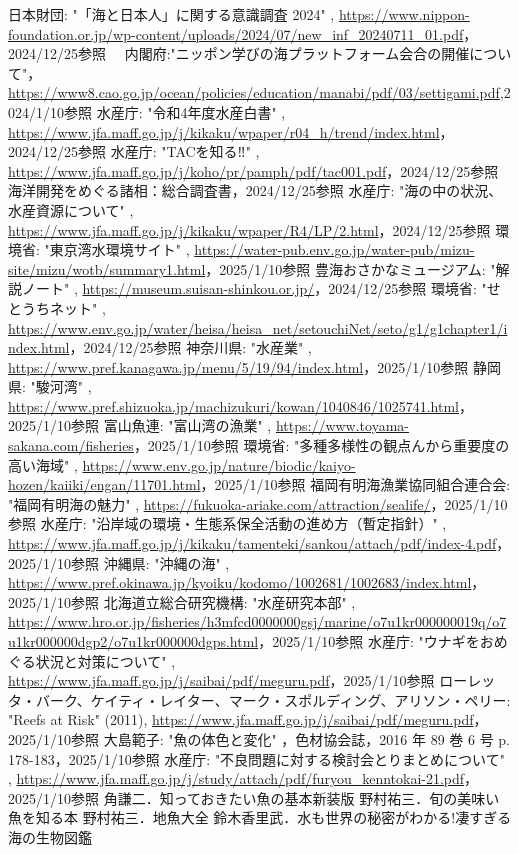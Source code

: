 \documentclass[12pt,a4j,titlepage]{ltjsarticle}
\begin{document}
\begin{thebibliography}{99}
  日本財団: "「海と日本人」に関する意識調査 2024" , \url{https://www.nippon-foundation.or.jp/wp-content/uploads/2024/07/new_inf_20240711_01.pdf}，2024/12/25参照
　内閣府:"ニッポン学びの海プラットフォーム会合の開催について"，\url{https://www8.cao.go.jp/ocean/policies/education/manabi/pdf/03/settigami.pdf},2024/1/10参照
  水産庁: "令和4年度水産白書" , \url{https://www.jfa.maff.go.jp/j/kikaku/wpaper/r04_h/trend/index.html}，2024/12/25参照
  水産庁: "TACを知る‼︎" , \url{https://www.jfa.maff.go.jp/j/koho/pr/pamph/pdf/tac001.pdf}，2024/12/25参照
  海洋開発をめぐる諸相：総合調査書，2024/12/25参照
  水産庁: "海の中の状況、水産資源について" , \url{https://www.jfa.maff.go.jp/j/kikaku/wpaper/R4/LP/2.html}，2024/12/25参照
  環境省: "東京湾水環境サイト" , \url{https://water-pub.env.go.jp/water-pub/mizu-site/mizu/wotb/summary1.html}，2025/1/10参照
  豊海おさかなミュージアム: "解説ノート" , \url{https://museum.suisan-shinkou.or.jp/}，2024/12/25参照
  環境省: "せとうちネット" , \url{https://www.env.go.jp/water/heisa/heisa_net/setouchiNet/seto/g1/g1chapter1/index.html}，2024/12/25参照
  神奈川県: "水産業" , \url{https://www.pref.kanagawa.jp/menu/5/19/94/index.html}，2025/1/10参照
  静岡県: "駿河湾" , \url{https://www.pref.shizuoka.jp/machizukuri/kowan/1040846/1025741.html}，2025/1/10参照
  富山魚連: "富山湾の漁業" , \url{https://www.toyama-sakana.com/fisheries}，2025/1/10参照
  環境省: "多種多様性の観点んから重要度の高い海域" , \url{https://www.env.go.jp/nature/biodic/kaiyo-hozen/kaiiki/engan/11701.html}，2025/1/10参照
  福岡有明海漁業協同組合連合会: "福岡有明海の魅力" , \url{https://fukuoka-ariake.com/attraction/sealife/}，2025/1/10参照
  水産庁: "沿岸域の環境・生態系保全活動の進め方（暫定指針）" , \url{https://www.jfa.maff.go.jp/j/kikaku/tamenteki/sankou/attach/pdf/index-4.pdf}，2025/1/10参照
  沖縄県: "沖縄の海" , \url{https://www.pref.okinawa.jp/kyoiku/kodomo/1002681/1002683/index.html}，2025/1/10参照
  北海道立総合研究機構: "水産研究本部" , \url{https://www.hro.or.jp/fisheries/h3mfcd0000000gsj/marine/o7u1kr000000019q/o7u1kr000000dgp2/o7u1kr000000dgps.html}，2025/1/10参照
  水産庁: "ウナギをおめぐる状況と対策について" , \url{https://www.jfa.maff.go.jp/j/saibai/pdf/meguru.pdf}，2025/1/10参照
  ローレッタ・バーク、ケイティ・レイター、マーク・スポルディング、アリソン・ペリー: "Reefs at Risk" (2011), \url{https://www.jfa.maff.go.jp/j/saibai/pdf/meguru.pdf}，2025/1/10参照
  大島範子: "魚の体色と変化"  ，色材協会誌，2016 年 89 巻 6 号 p. 178-183，2025/1/10参照
  水産庁: "不良問題に対する検討会とりまとめについて" , \url{https://www.jfa.maff.go.jp/j/study/attach/pdf/furyou_kenntokai-21.pdf}，2025/1/10参照
 角謙二．知っておきたい魚の基本新装版
\bibitem{} 野村祐三．旬の美味い魚を知る本
\bibitem{} 野村祐三．地魚大全
 鈴木香里武．水も世界の秘密がわかる!凄すぎる海の生物図鑑
\end{thebibliography}
\end{document}
